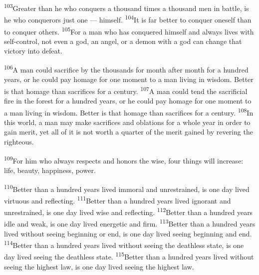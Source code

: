 \documentclass[openany,12pt,english]{book}
\newenvironment{para}{\par\pretolerance=100\tolerance=200\setlength{\emergencystretch}{0.6em}\relax}{\par}
\begin{document}
\begin{para}
    \textsuperscript{103}\thinspace{}Greater than he who conquers a thou\-sand times a thou\-sand men in bat\-tle, is he who conquerors just one --- him\-self.
    \textsuperscript{104}\thinspace{}It is far bet\-ter to con\-quer one\-self than to con\-quer others.
    \textsuperscript{105}\thinspace{}For a man who has conquered him\-self and al\-ways lives with self-control, not e\-ven a god, an an\-gel, or a de\-mon with a god can change that vic\-to\-ry in\-to de\-feat.
\end{para}

\begin{para}
    \textsuperscript{106}\thinspace{}A man could sac\-ri\-fice by the thousands for month af\-ter month for a hun\-dred years, or he could pay hom\-age for one mo\-ment to a man liv\-ing in wis\-dom. Bet\-ter is that hom\-age than sacrifices for a cen\-tu\-ry.
    \textsuperscript{107}\thinspace{}A man could tend the sac\-ri\-fi\-cial fire in the for\-est for a hun\-dred years, or he could pay hom\-age for one mo\-ment to a man liv\-ing in wis\-dom. Bet\-ter is that hom\-age than sacrifices for a cen\-tu\-ry.
    \textsuperscript{108}\thinspace{}In this world, a man may make sacrifices and oblations for a whole year in or\-der to gain mer\-it, yet all of it is not worth a quar\-ter of the mer\-it gained by re\-ver\-ing the right\-eous.
\end{para}

\begin{para}
    \textsuperscript{109}\thinspace{}For him who al\-ways respects and hon\-ors the wise, four things will in\-crease: life, beau\-ty, hap\-pi\-ness, pow\-er.
\end{para}

\begin{para}
    \textsuperscript{110}\thinspace{}Bet\-ter than a hun\-dred years lived im\-mor\-al and un\-re\-strained, is one day lived vir\-tu\-ous and reflecting.
    \textsuperscript{111}\thinspace{}Bet\-ter than a hun\-dred years lived ig\-no\-rant and un\-re\-strained, is one day lived wise and reflecting.
    \textsuperscript{112}\thinspace{}Bet\-ter than a hun\-dred years i\-dle and weak, is one day lived en\-er\-get\-ic and firm.
    \textsuperscript{113}\thinspace{}Bet\-ter than a hun\-dred years lived with\-out see\-ing be\-gin\-ning or end, is one day lived see\-ing be\-gin\-ning and end.
    \textsuperscript{114}\thinspace{}Bet\-ter than a hun\-dred years lived with\-out see\-ing the death\-less state, is one day lived see\-ing the death\-less state.
    \textsuperscript{115}\thinspace{}Bet\-ter than a hun\-dred years lived with\-out see\-ing the highest law, is one day lived see\-ing the highest law.
\end{para}
\end{document}
